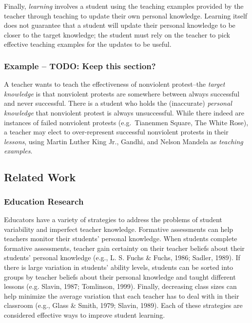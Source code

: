 \documentclass[10pt, letterpaper]{apa6}
\begin{document}
Finally, \emph{learning} involves a student using the teaching examples
provided by the teacher through teaching to update their own personal
knowledge. Learning itself does not guarantee that a student will update
their personal knowledge to be closer to the target knowledge; the
student must rely on the teacher to pick effective teaching examples for
the updates to be useful.

\subsubsection{Example -- TODO: Keep this
section?}\label{example-todo-keep-this-section}

A teacher wants to teach the effectiveness of nonviolent protest--the
\emph{target knowledge} is that nonviolent protests are somewhere
between always successful and never successful. There is a student who
holds the (inaccurate) \emph{personal knowledge} that nonviolent protest
is always unsuccessful. While there indeed are instances of failed
nonviolent protests (e.g.~Tianenmen Square, The White Rose), a teacher
may elect to over-represent successful nonviolent protests in their
\emph{lessons}, using Martin Luther King Jr., Gandhi, and Nelson Mandela
as \emph{teaching examples}.

\subsection{Related Work}\label{related-work}

\subsubsection{Education Research}\label{education-research}

Educators have a variety of strategies to address the problems of
student variability and imperfect teacher knowledge. Formative
assessments can help teachers monitor their students' personal
knowledge. When students complete formative assessments, teacher gain
certainty on their teacher beliefs about their students' personal
knowledge (e.g., L. S. Fuchs \& Fuchs, 1986; Sadler, 1989). If there is
large variation in students' ability levels, students can be sorted into
groups by teacher beliefs about their personal knowledge and taught
different lessons (e.g. Slavin, 1987; Tomlinson, 1999). Finally,
decreasing class sizes can help minimize the average variation that each
teacher has to deal with in their classroom (e.g., Glass \& Smith, 1979;
Slavin, 1989). Each of these strategies are considered effective ways to
improve student learning.
\end{document}

